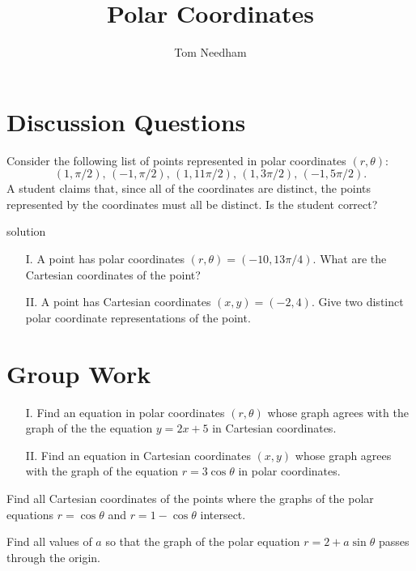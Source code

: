 \documentclass[handout]{ximera}
\author{Tom Needham}
\title[Collaborate:]{Polar Coordinates}
\begin{document}
\begin{abstract}
\end{abstract}
\maketitle

\section{Discussion Questions}

\begin{problem}
Consider the following list of points represented in polar coordinates $(r,\theta)$:
$$
(1,\pi/2), \, (-1,\pi/2),\,  (1,11\pi/2), \, (1,3\pi/2), \, (-1,5\pi/2).
$$
A student claims that, since all of the coordinates are distinct, the points represented by the coordinates must all be distinct. Is the student correct?
\begin{solution}
solution
\end{solution}
\end{problem}

\begin{problem}
\begin{itemize}
\item[I.] A point has polar coordinates $(r,\theta)=(-10,13\pi/4)$. What are the Cartesian coordinates of the point?

\item[II.] A point has Cartesian coordinates $(x,y)=(-2,4)$. Give two distinct polar coordinate representations of the point.
\end{itemize}
\end{problem}


\section{Group Work}

\begin{problem}
\begin{itemize}
\item[I.] Find an equation in polar coordinates $(r,\theta)$ whose graph agrees with the graph of the the equation $y=2x+5$ in Cartesian coordinates.
\item[II.] Find an equation in Cartesian coordinates $(x,y)$ whose graph agrees with the graph of the equation $r=3 \cos \theta$ in polar coordinates.
\end{itemize}
\end{problem}


\begin{problem}
Find all Cartesian coordinates of the points where the graphs of the polar equations $r=\cos \theta$ and $r=1-\cos \theta$ intersect.
\end{problem}

\begin{problem}
Find all values of $a$ so that the graph of the polar equation $r = 2 + a \sin \theta$ passes through the origin.
\end{problem}
\end{document}
